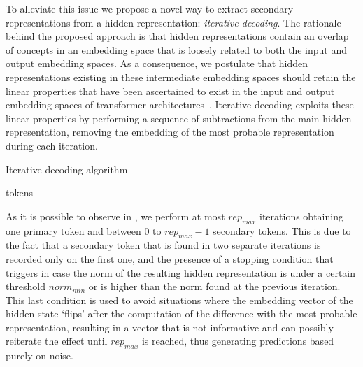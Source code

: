 To alleviate this issue we propose a novel way to extract secondary representations from a hidden representation: \emph{iterative decoding}.
The rationale behind the proposed approach is that hidden representations contain an overlap of concepts in an embedding space that is loosely related to both the input and output embedding spaces.
As a consequence, we postulate that hidden representations existing in these intermediate embedding spaces should retain the linear properties that have been ascertained to exist in the input and output embedding spaces of transformer architectures~\cite{mikolov2013,park2023}.
Iterative decoding exploits these linear properties by performing a sequence of subtractions from the main hidden representation, removing the embedding of the most probable representation during each iteration.
\begin{algorithm}
    \caption{Iterative decoding algorithm}\label{alg:method_intravisto_iter-dec}
    \begin{algorithmic}
            \ENDIF{}
            \ENDIF{}
        \ENDWHILE{}
        \RETURN tokens
    \end{algorithmic}
\end{algorithm}
As it is possible to observe in , we perform at most ${rep}_{max}$ iterations obtaining one primary token and between $0$ to ${rep}_{max} - 1$ secondary tokens.
This is due to the fact that a secondary token that is found in two separate iterations is recorded only on the first one, and the presence of a stopping condition that triggers in case the norm of the resulting hidden representation is under a certain threshold ${norm}_{min}$ or is higher than the norm found at the previous iteration.
This last condition is used to avoid situations where the embedding vector of the hidden state `flips' after the computation of the difference with the most probable representation, resulting in a vector that is not informative and can possibly reiterate the effect until ${rep}_{max}$ is reached, thus generating predictions based purely on noise. 

